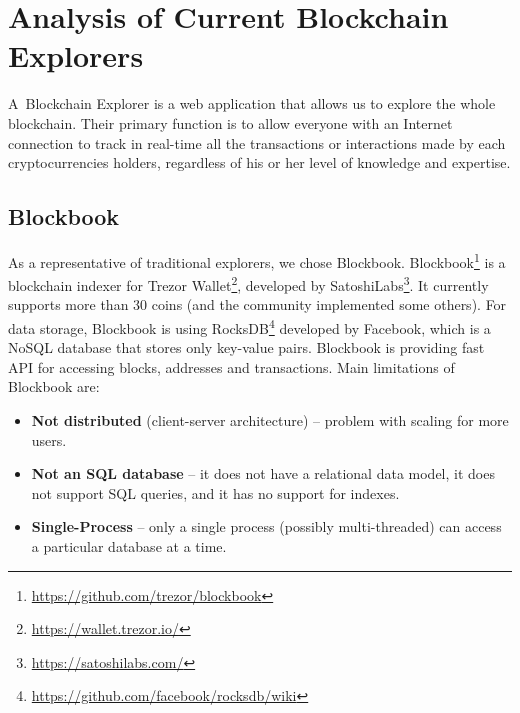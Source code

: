 \section{Analysis of Current Blockchain Explorers}
A~Blockchain Explorer is a web application that allows us to explore the whole blockchain. Their primary function is to allow everyone with an Internet connection to track in real-time all the transactions or interactions made by each cryptocurrencies holders, regardless of his or her level of knowledge and expertise. \cite{laurence2019blockchain, dhillon2017blockchain}


\subsection{Blockbook}
As a representative of traditional explorers, we chose Blockbook. Blockbook\footnote{\url{https://github.com/trezor/blockbook}} is a blockchain indexer for Trezor Wallet\footnote{\url{https://wallet.trezor.io/}}, developed by SatoshiLabs\footnote{\url{https://satoshilabs.com/}}. It currently supports more than 30 coins (and the community implemented some others). For data storage, Blockbook is using RocksDB\footnote{\url{https://github.com/facebook/rocksdb/wiki}} developed by Facebook, which is a NoSQL database that stores only key-value pairs. Blockbook is providing fast API for accessing blocks, addresses and transactions. Main limitations of Blockbook are:
\begin{itemize}
    \item \textbf{Not distributed} (client-server architecture) -- problem with scaling for more users. 
    \item \textbf{Not an SQL database} -- it does not have a relational data model, it does not support SQL queries, and it has no support for indexes.
    \item \textbf{Single-Process} -- only a single process (possibly multi-threaded) can access a particular database at a time.
\end{itemize}
